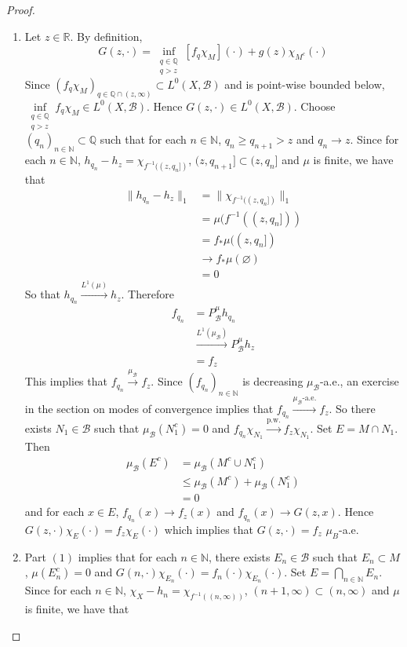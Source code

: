 \documentclass{book}
\theoremstyle{definition}
\newcommand{\N}{\mathbb{N}}
\newcommand{\Q}{\mathbb{Q}}
\newcommand{\R}{\mathbb{R}}
\newcommand{\MB}{\mathcal{B}}
\DeclareMathOperator*{\0}{\mbf{0}}
\DeclareMathOperator*{\1}{\mbf{1}}
\newcommand{\convt}[1]{\xrightarrow{\text{#1}}}
\newcommand{\conv}[1]{\xrightarrow{#1}}
\begin{document}
	\begin{proof}\
		\begin{enumerate}
			\item Let $z \in \R$. By definition,
			$$G(z, \cdot) = \inf\limits_{\substack{q \in \Q \\ q > z}}[ f_q \chi_M ] (\cdot) + g(z) \chi_{M^c}(\cdot)$$ 
			Since $(f_{q} \chi_{M})_{q \in \Q\cap (z, \infty)} \subset L^0(X, \MB)$ and is point-wise bounded below, $\inf\limits_{\substack{q \in \Q \\ q > z}} f_q \chi_M  \in L^0(X, \MB)$. Hence $G(z, \cdot) \in L^0(X, \MB)$. Choose $(q_n)_{n \in \N} \subset \Q$ such that for each $n \in \N$, $q_n \geq q_{n+1} > z$ and $q_n \rightarrow z$. Since for each $n \in \N$, $h_{q_n} - h_{z} = \chi_{f^{-1}((z, q_n])}$, $(z, q_{n+1}] \subset (z, q_n]$ and $\mu$ is finite, we have that 
			\begin{align*}
				\|h_{q_n} - h_z\|_1
				& = \|\chi_{f^{-1}((z, q_n])}\|_1 \\
				& = \mu(f^{-1}((z, q_n])) \\
				& = f_* \mu ((z, q_n]) \\
				& \rightarrow f_* \mu(\varnothing) \\
				& = 0
			\end{align*}
			So that $h_{q_n} \conv{L^1(\mu)} h_z$. Therefore  
			\begin{align*}
				f_{q_n} 
				& = P^{\mu}_{\MB} h_{q_n} \\
				& \conv{L^1(\mu_{\MB})} P^{\mu}_{\MB} h_z \\
				& = f_z
			\end{align*}
			This implies that $f_{q_n} \conv{\mu_{\MB}} f_z$. Since $(f_{q_n})_{n \in \N}$ is decreasing $\mu_{\MB}$-a.e., an exercise in the section on modes of convergence implies that $f_{q_n} \convt{$\mu_{\MB}$-a.e.} f_z$. So there exists $N_1 \in \MB$ such that $\mu_{\MB}(N_1^c) = 0$ and $f_{q_n} \chi_{N_1} \convt{p.w.} f_z \chi_{N_1}$. Set $E = M \cap N_1$. Then  
			\begin{align*}
				\mu_{\MB}(E^c)
				& = \mu_{\MB}(M^c \cup N_1^c) \\ 
				& \leq \mu_{\MB}(M^c) + \mu_{\MB}(N_1^c) \\
				& = 0
			\end{align*}
			and for each $x \in E$, $f_{q_n}(x) \rightarrow f_z(x)$ and $f_{q_n}(x) \rightarrow G(z, x)$. Hence $G(z, \cdot)\chi_{E}(\cdot) = f_z \chi_{E}( \cdot)$ which implies that $G(z, \cdot) = f_z$ $\mu_B$-a.e.\\
			\item Part $(1)$ implies that for each $n \in \N$, there exists $E_n \in \MB$ such that $E_n \subset M$, $\mu(E_n^c) = 0$ and $G(n, \cdot)\chi_{E_n}(\cdot) = f_n(\cdot) \chi_{E_n}(\cdot)$. Set $E = \bigcap\limits_{n \in \N} E_n$. Since for each $n \in \N$, $\chi_{X} - h_n = \chi_{f^{-1}((n, \infty))}$, $(n+1, \infty) \subset (n, \infty)$ and $\mu$ is finite, we have that 

\end{enumerate}
\end{proof}
\end{document}
